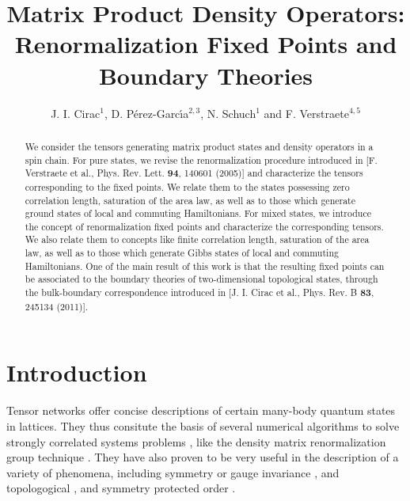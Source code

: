 \documentclass{elsarticle}
\begin{document}
\title{Matrix Product Density Operators: Renormalization Fixed Points and Boundary Theories}

\author{J. I. {Cirac}$^1$, D. {P\'erez-Garc\'{\i}a}$^{2,3}$, N. {Schuch}$^1$ and F. {Verstraete}$^{4,5}$}
\address{$^1$ Max-Planck-Institut f{\"{u}}r Quantenoptik,
Hans-Kopfermann-Str.\ 1, D-85748 Garching, Germany}
\address{$^2$ Departamento de An\'alisis Matem\'atico, Universidad Complutense de Madrid, Plaza de Ciencias 3,
    28040 Madrid, Spain}
\address{$^3$ ICMAT, Nicolas Cabrera, Campus de Cantoblanco, 28049 Madrid, Spain}
\address{$^4$ Department of Physics and Astronomy, Ghent University}
\address{$^5$ Vienna Center for Quantum Technology, University of Vienna}


\begin{abstract}
    We consider the tensors generating matrix product states and density operators  in a spin chain. For pure states, we revise the renormalization procedure introduced in [F. Verstraete et al., Phys. Rev. Lett. {\bf 94}, 140601 (2005)] and characterize the tensors corresponding to the fixed points. We relate them to the states possessing zero correlation length, saturation of the area law, as well as to those which generate ground states of local and commuting Hamiltonians. For mixed states, we introduce the concept of renormalization fixed points and characterize the corresponding tensors. We also relate them to concepts like finite correlation length, saturation of the area law, as well as to those which generate Gibbs states of local and commuting Hamiltonians. One of the main result of this work is that the resulting fixed points can be associated to the boundary theories of two-dimensional topological states, through the bulk-boundary correspondence introduced in [J. I. Cirac et al., Phys. Rev. B {\bf 83}, 245134 (2011)].
\end{abstract}


\maketitle

\section{Introduction}

Tensor networks offer concise descriptions of certain many-body
quantum states in lattices. They thus consitute the basis of several numerical
algorithms to solve strongly correlated systems problems \cite{Valentin,CiracVerstraete},
like the density
matrix renormalization group technique \cite{DMRG,Schollwock}. They have also proven to
be very useful in the description of a variety of phenomena,
including symmetry \cite{Sanz} or gauge invariance \cite{Tagglia,Jutho},
and topologogical \cite{Norberttopo,Franktopo}, and symmetry protected order
\cite{GuWen}.
\end{document}
